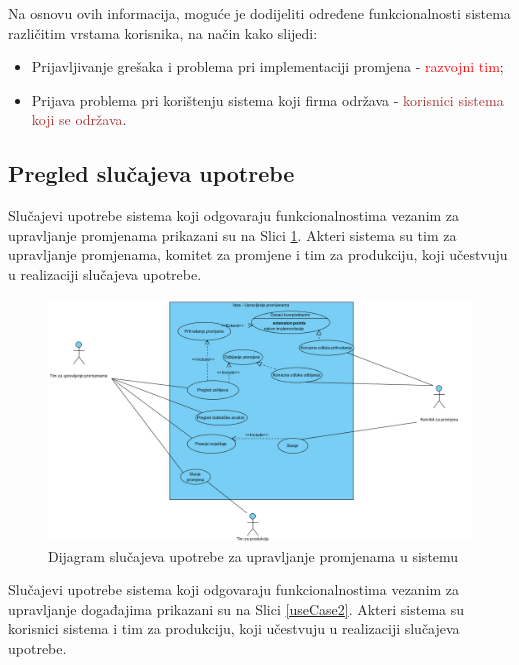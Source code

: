 \documentclass[12pt,a4paper]{article}
\begin{document}
Na osnovu ovih informacija, moguće je dodijeliti određene funkcionalnosti sistema različitim vrstama korisnika, na način kako slijedi:

\begin{itemize}
\renewcommand\labelitemi{$\square$}
\item Prijavljivanje grešaka i problema pri implementaciji promjena - \textcolor{red}{razvojni tim};
\item Prijava problema pri korištenju sistema koji firma održava - \textcolor{brown}{korisnici sistema koji se održava}.
\end{itemize}

\newpage

\subsection{Pregled slučajeva upotrebe}

\quad Slučajevi upotrebe sistema koji odgovaraju funkcionalnostima vezanim za upravljanje promjenama prikazani su na Slici \ref{useCase1}. Akteri sistema su tim za upravljanje promjenama, komitet za promjene i tim za produkciju, koji učestvuju u realizaciji slučajeva upotrebe.

\begin{figure}[H]
\center
\includegraphics[scale=0.4]{../res/useCase1.PNG}
\caption{Dijagram slučajeva upotrebe za upravljanje promjenama u sistemu}
\label{useCase1}
\end{figure}

Slučajevi upotrebe sistema koji odgovaraju funkcionalnostima vezanim za upravljanje događajima prikazani su na Slici \ref{useCase2}. Akteri sistema su korisnici sistema i tim za produkciju, koji učestvuju u realizaciji slučajeva upotrebe.
\end{document}
